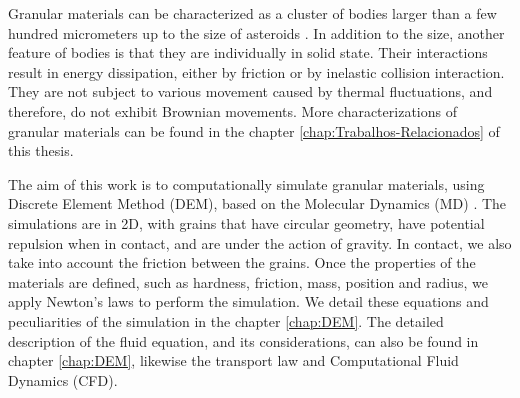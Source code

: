 
    Granular materials can be characterized as a cluster of bodies larger than a few hundred micrometers up to the size of asteroids \cite{Sands_Powders_and_Grains, The_Physics_of_Granular_Media}. In addition to the size, another feature of bodies is that they are individually in solid state. Their interactions result in energy dissipation, either by friction or by inelastic collision interaction. They are not subject to various movement caused by thermal fluctuations, and therefore, do not exhibit Brownian movements. More characterizations of granular materials can be found in the chapter \ref{chap:Trabalhos-Relacionados} of this thesis.


    The aim of this work is to computationally simulate granular materials, using Discrete Element Method (DEM), based on the Molecular Dynamics (MD) \cite{Computer_Simulation_of_Liquids}. The simulations are in 2D, with grains that have circular geometry, have potential repulsion when in contact, and are under the action of gravity. In contact, we also take into account the friction between the grains. Once the properties of the materials are defined, such as hardness, friction, mass, position and radius, we apply Newton's laws to perform the simulation. We detail these equations and peculiarities of the simulation in the chapter \ref{chap:DEM}. The detailed description of the fluid equation, and its considerations, can also be found in chapter \ref{chap:DEM}, likewise the transport law and Computational Fluid Dynamics (CFD).

